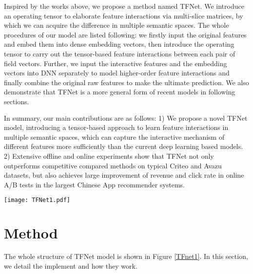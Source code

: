 \documentclass[sigconf]{acmart}
\begin{document}
Inspired by the works above, we propose a method named TFNet. We introduce an operating tensor to elaborate feature interactions via multi-slice matrices, by which we can acquire the difference in multiple semantic spaces. The whole procedures of our model are listed following: we firstly input the original features and embed them into dense embedding vectors, then introduce the operating tensor to carry out the tensor-based feature interactions between each pair of field vectors. Further, we input the interactive features and the embedding vectors into DNN separately to model higher-order feature interactions  and finally combine the original raw features to make the ultimate prediction. We also demonstrate that TFNet is a more general form of recent models in following sections. 

In summary, our main contributions are as follows: 1) We propose a novel TFNet model, introducing a tensor-based approach to learn feature interactions in multiple semantic spaces, which can capture the interactive mechanism of different features more sufficiently than the current deep learning based models. 2) Extensive offline and online experiments show that TFNet not only outperforms competitive compared methods on typical Criteo and Avazu datasets, but also achieves large improvement of revenue and click rate in online A/B tests in the largest Chinese App recommender systems. 


\begin{figure*}[t]
\setlength{\abovecaptionskip}{0pt}  \setlength{\belowcaptionskip}{0pt}  \begin{center}
   \vspace{-4mm}
   \texttt{[image: TFNet1.pdf]}
   \end{center}
\caption{The architecture of our proposed TFNet model, which consists of the following parts: sparse input layer, embedding layer, tensor-based feature interaction layer, higher-order feature interaction layer and the final output.}
   \label{TFnet1}
\end{figure*}


\section{Method}
The whole structure of TFNet model is shown in Figure \ref{TFnet1}. In this section, we detail the implement and how they work.
\end{document}
